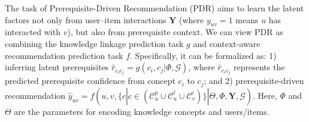     


The task of Prerequisite-Driven Recommendation (PDR) aims to learn the latent factors not only from user--item interactions $\mathbf{Y}$ (where $y_{uv}=1$ means $u$ has interacted with $v$), but also from prerequisite context.
We can view PDR as combining the knowledge linkage prediction task $g$ and context-aware recommendation prediction task $f$. 
Specifically, it can be formalized as: 1) inferring latent prerequisites $\hat{r}_{c_ic_j}=g(c_i,c_j|\Phi,\mathcal{G})$, where $\hat{r}_{c_ic_j}$ represents the predicted prerequisite confidence from concept $c_i$ to $c_j$; and 2) prerequisite-driven recommendation $\hat{y}_{uv}=f(u,v,\{c|c\in (\mathcal{C}_u^p \cup \mathcal{C}_u^t \cup \mathcal{C}_v^i)\} |\Theta,\Phi, \mathbf{Y},\mathcal{G})$.  Here, $\Phi$ and $\Theta$ are the parameters for encoding knowledge concepts and users/items. 

